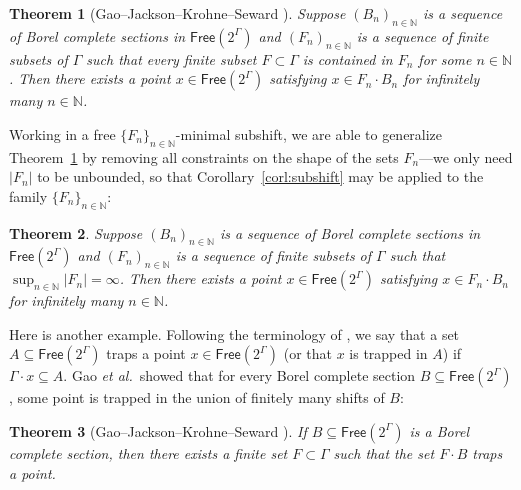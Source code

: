 \documentclass[11pt,reqno,psamsfonts]{amsart}
\theoremstyle{bfnote}
\newtheorem{theo}{Theorem}[section]
\theoremstyle{definition}
\theoremstyle{remark}
\newcommand{\0}{\varnothing}
\newcommand{\set}[1]{\{#1\}}
\newcommand{\emphd}[1]{{\fontseries{b}\selectfont\textsf{#1}}}
\newcommand{\G}{\Gamma}
\newcommand{\Free}{\mathsf{Free}}
\newcommand{\N}{\mathbb{N}}
\numberwithin{equation}{section}
\begin{document}
    \begin{theo}[{Gao--Jackson--Krohne--Seward \cite[Thm.~1.1]{GJKS_Borel}}]\label{theo:GJKS1}
        Suppose $(B_n)_{n \in \N}$ is a sequence of Borel complete sections in $\Free(2^\G)$ and $(F_n)_{n \in \N}$ is a sequence of finite subsets of $\G$ such that every finite subset $F \subset \G$ is contained in $F_n$ for some $n \in \N$. %
        Then there exists a point $x \in \Free(2^\G)$ satisfying $x \in F_n \cdot B_n$ %
        for infinitely many $n \in \N$.
    \end{theo}

    Working in a free $\set{F_n}_{n \in \N}$-minimal subshift, we are able to generalize Theorem~\ref{theo:GJKS1} by removing all constraints on the shape of the sets $F_n$---we only need $|F_n|$ to be unbounded, so that Corollary~\ref{corl:subshift} may be applied to the family $\set{F_n}_{n \in \N}$:

    \begin{tcolorbox}
    \begin{theo}\label{theo:DST1}
        Suppose $(B_n)_{n \in \N}$ is a sequence of Borel complete sections in $\Free(2^\G)$ and $(F_n)_{n \in \N}$ is a sequence of finite subsets of $\G$ such that $\sup_{n \in \N}|F_n| = \infty$. Then there exists a point $x \in \Free(2^\G)$ satisfying $x \in F_n \cdot B_n$ for infinitely many $n \in \N$.
    \end{theo}
    \end{tcolorbox}

    
    Here is another example. Following the terminology of \cite{LLLDyn3}, we say that a set $A \subseteq \Free(2^\G)$ \emphd{traps} a point $x \in \Free(2^\G)$ (or that $x$ is \emphd{trapped} in $A$) if $\G \cdot x \subseteq A$. Gao \emph{et al.}~showed that for every Borel complete section $B \subseteq \Free(2^\G)$, some point is trapped in the union of finitely many shifts of $B$:

    \begin{theo}[{Gao--Jackson--Krohne--Seward \cite[Thm.~1.2]{GJKS_Borel}}]\label{theo:GJKS}
        If $B \subseteq \Free(2^\G)$ is a Borel complete section, then there exists a finite set $F \subset \G$ such that the set $F \cdot B$ traps a point.
    \end{theo}
\end{document}
